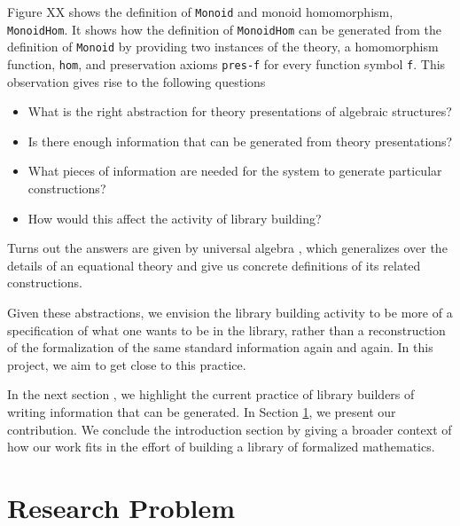 Figure XX shows the definition of \verb|Monoid| and monoid homomorphism, \verb|MonoidHom|. It shows how the definition of \verb|MonoidHom| can be generated from the definition of \verb|Monoid| by providing two instances of the theory, a homomorphism function, \verb|hom|, and preservation axioms \verb|pres-f| for every function symbol \verb|f|. This observation gives rise to the following questions 
\begin{itemize}
    \item What is the right abstraction for theory presentations of algebraic structures?
    \item Is there enough information that can be generated from theory presentations? 
    \item What pieces of information are needed for the system to generate
    particular constructions? 
    \item How would this affect the activity of library building? 
\end{itemize} 
Turns out the answers are given by universal algebra , which generalizes over the details of an equational theory and give us concrete definitions of its related constructions. 

Given these abstractions, we envision the library building activity to be more of a specification of what one wants to be in the library, rather than a reconstruction of the formalization of the same standard information again and again. In this project, we aim to get close to this practice. 

In the next section , we highlight the current practice of library builders of writing information that can be generated. In Section \ref{}, we present our contribution. We conclude the introduction section by giving a broader context of how our work fits in the effort of building a library of formalized mathematics. 

\section{Research Problem}

